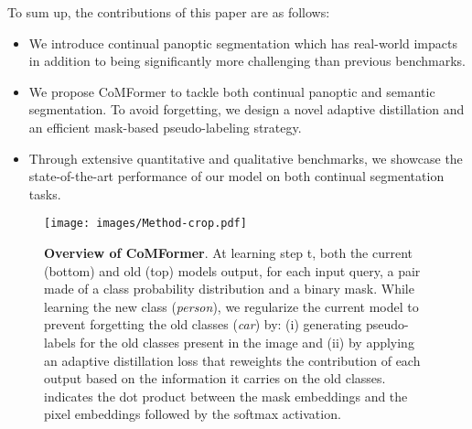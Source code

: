 \documentclass[10pt,twocolumn,letterpaper]{article}
\begin{document}
To sum up, the contributions of this paper are as follows:
\begin{itemize}[noitemsep,topsep=0pt]
\item We introduce continual panoptic segmentation which has real-world impacts in addition to being significantly more challenging than previous benchmarks.
\item We propose CoMFormer to tackle both continual panoptic and semantic segmentation. To avoid forgetting, we design a novel adaptive distillation and an efficient mask-based pseudo-labeling strategy.
\item Through extensive quantitative and qualitative benchmarks, we showcase the state-of-the-art performance of our model on both continual segmentation tasks.
\end{itemize}
\vspace{-0.5em} 
\begin{figure*}[t]
    \texttt{[image: images/Method-crop.pdf]}
    \caption{\textbf{Overview of CoMFormer}. At learning step t, both the current (bottom) and old (top) models output, for each input query, a pair made of a class probability distribution and a binary mask. While learning the new class (\textit{person}), we regularize the current model to prevent forgetting the old classes (\textit{car}) by: (i) generating pseudo-labels for the old classes present in the image and (ii) by applying an adaptive distillation loss that reweights the contribution of each output based on the information it carries on the old classes.  indicates the dot product between the mask embeddings  and the pixel embeddings  followed by the softmax activation.
    }\label{fig:model} \vspace{-1em}
\end{figure*}
\end{document}
